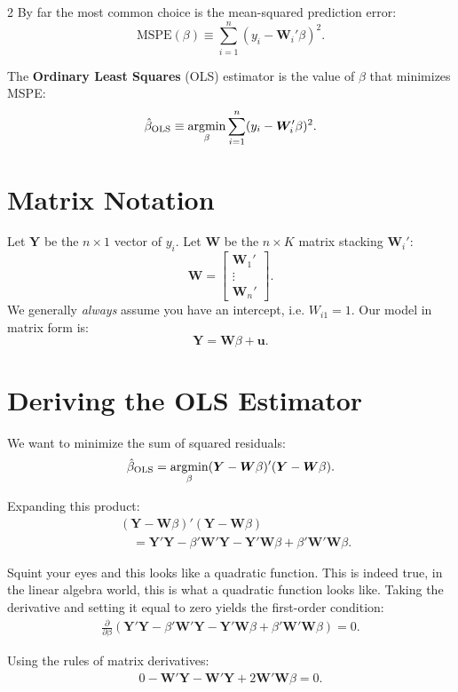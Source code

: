 \documentclass[12pt]{article}
\begin{document}
\begin{multicols}{2}
  By far the most common choice is the mean-squared prediction error:
  $$
  \text{MSPE}(\beta) \equiv \sum_{i=1}^n (y_i - \bm{W}_i' \beta)^2.
  $$

  The \textbf{Ordinary Least Squares} (OLS) estimator is the value of $\beta$ that minimizes MSPE:
  $$
  \hat{\beta}_{\text{OLS}} \equiv \operatorname*{argmin}_\beta \sum_{i=1}^n (y_i - \bm{W}_i' \beta)^2.
  $$

  \section*{Matrix Notation}

  Let $\bm{Y}$ be the $n \times 1$ vector of $y_i$. Let $\bm{W}$ be the $n \times K$ matrix stacking $\bm{W}_i'$:
  $$
  \bm{W} =
  \begin{bmatrix}
    \bm{W}_1' \\
    \vdots    \\
    \bm{W}_n'
  \end{bmatrix}.
  $$
  We generally \emph{always} assume you have an intercept, i.e. $W_{i1} = 1$.
  Our model in matrix form is:
  $$
  \bm{Y} = \bm{W} \beta + \bm{u}.
  $$

  \section*{Deriving the OLS Estimator}

  We want to minimize the sum of squared residuals:
  $$
  \hat{\beta}_{\text{OLS}} = \operatorname*{argmin}_\beta (\bm{Y} - \bm{W} \beta)'(\bm{Y} - \bm{W} \beta).
  $$

  Expanding this product:
  \begin{align*}
    &(\bm{Y} - \bm{W} \beta)'(\bm{Y} - \bm{W} \beta) \\
    &\quad =
    \bm{Y}' \bm{Y} - \beta' \bm{W}' \bm{Y} - \bm{Y}' \bm{W} \beta + \beta' \bm{W}' \bm{W} \beta.
  \end{align*}

  Squint your eyes and this looks like a quadratic function.
  This is indeed true, in the linear algebra world, this is what a quadratic function looks like.
  Taking the derivative and setting it equal to zero yields the first-order condition:
  \begin{align*}
    \frac{\partial}{\partial \beta} \left( \bm{Y}' \bm{Y} - \beta' \bm{W}' \bm{Y} - \bm{Y}' \bm{W} \beta + \beta' \bm{W}' \bm{W} \beta \right) = 0.
  \end{align*}

  Using the rules of matrix derivatives:
  \begin{align*}
    0 - \bm{W}' \bm{Y} - \bm{W}' \bm{Y} + 2 \bm{W}' \bm{W} \beta = 0.
  \end{align*}


\end{multicols}
\end{document}
